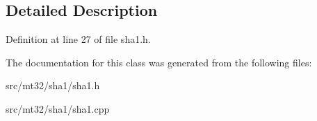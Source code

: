 

\subsection{Detailed Description}


Definition at line 27 of file sha1.\-h.



The documentation for this class was generated from the following files\-:\begin{DoxyCompactItemize}
\item 
src/mt32/sha1/sha1.\-h\item 
src/mt32/sha1/sha1.\-cpp\end{DoxyCompactItemize}
